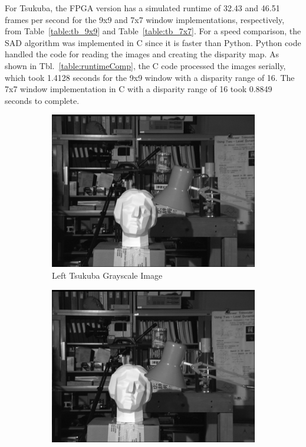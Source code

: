For Tsukuba, the FPGA version has a simulated runtime of 32.43 and 46.51 frames per second for the 9x9 and 7x7 window implementations, respectively, from Table~\ref{table:tb_9x9} and Table~\ref{table:tb_7x7}. For a speed comparison, the SAD algorithm was implemented in C since it is faster than Python. Python code handled the code for reading the images and creating the disparity map. As shown in Tbl.~\ref{table:runtimeComp}, the C code processed the images serially, which took 1.4128 seconds for the 9x9 window with a disparity range of 16. The 7x7 window implementation in C with a disparity range of 16 took 0.8849 seconds to complete.

\begin{figure}
\begin{center}
	\begin{subfigure}{0.45\textwidth}
		\includegraphics[width=\textwidth]{figures/tsukubaL.jpg}
		\caption{Left Tsukuba Grayscale Image}
		\label{fig:tsukubaL}
	\end{subfigure}
	\begin{subfigure}{0.45\textwidth}
		\includegraphics[width=\textwidth]{figures/tsukubaR.jpg}

\end{subfigure}
\end{center}
\end{figure}
